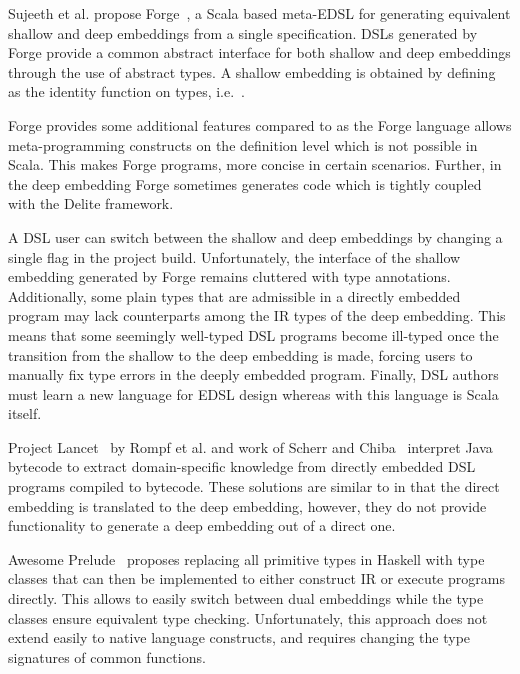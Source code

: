 Sujeeth et al. propose Forge~\cite{forge}, a Scala based meta-EDSL for generating equivalent
shallow and deep embeddings from a single specification.  DSLs
generated by Forge provide a common abstract interface for both
shallow and deep embeddings through the use of abstract 
types.  A shallow embedding is obtained by defining  as the
identity function on types, i.e.\ .

Forge provides some additional features compared to \yy as the Forge language allows meta-programming
 constructs on the definition level which is not possible in Scala. This makes Forge programs, more
 concise in certain scenarios. Further, in the deep embedding
 Forge sometimes generates code which is tightly coupled with the Delite framework.

A DSL user can switch between the shallow and deep embeddings by
changing a single flag in the project build. Unfortunately, the interface of the shallow
embedding generated by Forge remains cluttered with  type
annotations. Additionally, some plain types that are admissible in a
directly embedded program may lack counterparts among the IR types of
the deep embedding.  This means that some seemingly well-typed DSL
programs become ill-typed once the transition from the shallow to the
deep embedding is made, forcing users to manually fix type errors in
the deeply embedded program. Finally, DSL authors must learn a new
language for EDSL design whereas with \yy this language is Scala
itself.

Project Lancet~\cite{lancet} by Rompf et al. and work of Scherr and
Chiba~\cite{scherr_ecoop_2014} interpret Java bytecode to extract
domain-specific knowledge from directly embedded
DSL programs compiled to bytecode. These solutions are similar to \yy
in that the direct embedding is translated to the deep
embedding, however, they do not provide functionality to
generate a deep embedding out of a direct one.

Awesome Prelude~\cite{awesome} proposes replacing all primitive types
in Haskell with type classes that can then be implemented to either
construct IR or execute programs directly. This allows to easily
switch between dual embeddings while the type classes ensure
equivalent type checking.  Unfortunately, this approach does not
extend easily to native language constructs, and requires changing the
type signatures of common functions.

